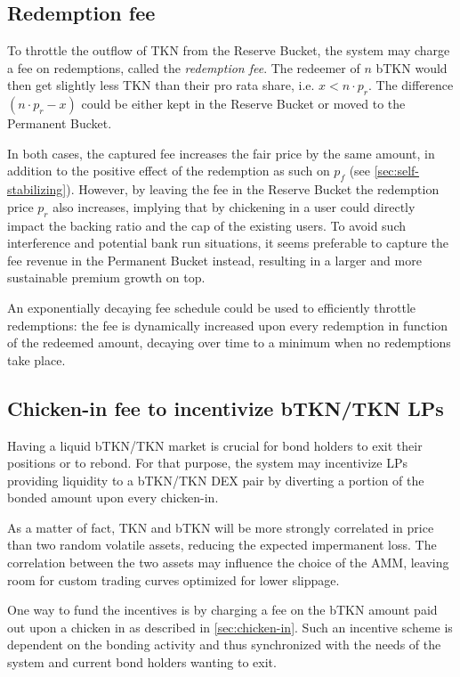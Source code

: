\documentclass{article}
\begin{document}
\subsection{Redemption fee}
  \label{sec:redemption-fee}
To throttle the outflow of TKN from the Reserve Bucket, the system may charge a fee on redemptions, called the \textit{redemption fee}. The redeemer of $n$ bTKN would then get slightly less TKN than their pro rata share, i.e. $x < n \cdot p_r$. The difference $(n \cdot p_r - x)$ could be either kept in the Reserve Bucket or moved to the Permanent Bucket. 

In both cases, the captured fee increases the fair price by the same amount, in addition to the positive effect of the redemption as such on $p_f$ (see \ref{sec:self-stabilizing}). However, by leaving the fee in the Reserve Bucket the redemption price $p_r$ also increases, implying that by chickening in a user could directly impact the backing ratio and the cap of the existing users. To avoid such interference and potential bank run situations, it seems preferable to capture the fee revenue in the Permanent Bucket instead, resulting in a larger and more sustainable premium growth on top.  

An exponentially decaying fee schedule could be used to efficiently throttle redemptions: the fee is dynamically increased upon every redemption in function of the redeemed amount, decaying over time to a minimum when no redemptions take place.

\subsection{Chicken-in fee to incentivize bTKN/TKN LPs}
  \label{sec:chicken-in-fee}
Having a liquid bTKN/TKN market is crucial for bond holders to exit their positions or to rebond.
For that purpose, the system may incentivize LPs providing liquidity to a bTKN/TKN DEX pair by diverting a portion of the bonded amount upon every chicken-in. 

As a matter of fact, TKN and bTKN will be more strongly correlated in price than two random volatile assets, reducing the expected impermanent loss. The correlation between the two assets may influence the choice of the AMM, leaving room for custom trading curves optimized for lower slippage.

One way to fund the incentives is by charging a fee on the bTKN amount paid out upon a chicken in as described in \ref{sec:chicken-in}. 
Such an incentive scheme is dependent on the bonding activity and thus synchronized with the needs of the system and current bond holders wanting to exit.
\end{document}
